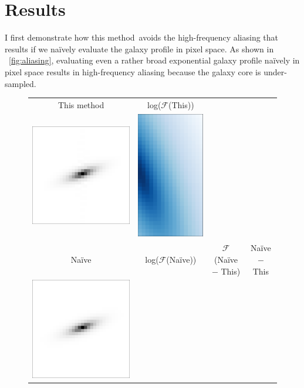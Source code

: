 \documentclass[11pt,preprint]{aastex}
\newcommand{\figref}[1]{\figurename~\ref{#1}}
\newcommand{\trick}{method}
\begin{document}
\section{Results}

I first demonstrate how this \trick\ avoids the high-frequency
aliasing that results if we na\"ively evaluate the galaxy profile in
pixel space.  As shown in \figref{fig:aliasing}, evaluating even a
rather broad exponential galaxy profile na\"ively in pixel space
results in high-frequency aliasing because the galaxy core is
under-sampled.


\begin{figure}
  \newcommand{\F}{$\mathcal{F}$}
  \begin{center}
    \begin{tabular}{@{}ccccc@{}}
      This method
      &
      log(\F(This))
      &
      \\
      \includegraphics[height=0.24\textwidth]{lopass-mine-pix}
      &
      \includegraphics[height=0.24\textwidth]{lopass-mine-logfourier}
      &
      \\
      Na\"ive
      & log(\F(Na\"ive))
      &
      \multicolumn{2}{c}{\F(Na\"ive $-$ This)}
      & Na\"ive $-$ This
      \\
      \includegraphics[height=0.24\textwidth]{lopass-naive-pix}

\end{tabular}
\end{center}
\end{figure}
\end{document}
